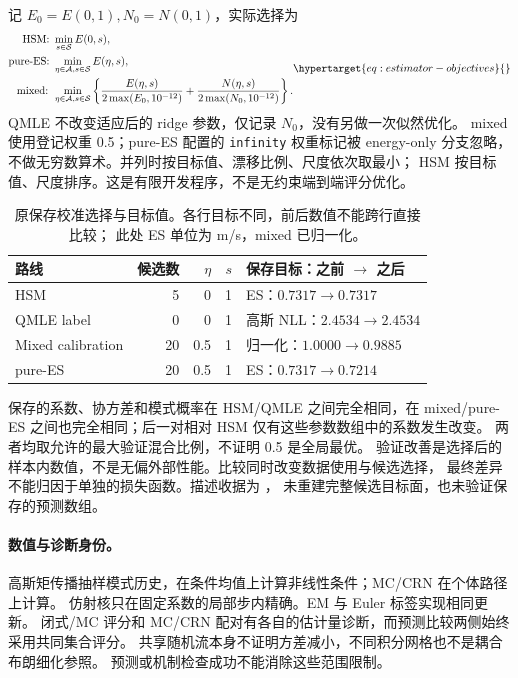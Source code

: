 记 \(E_0=E(0,1),N_0=N(0,1)\)，实际选择为
\begin{equation}
\begin{aligned}
\text{HSM: }&\min_{s\in\mathcal S} E(0,s),\\
\text{pure-ES: }&\min_{\eta\in\mathcal A,s\in\mathcal S}E(\eta,s),\\
\text{mixed: }&\min_{\eta\in\mathcal A,s\in\mathcal S}
 \left\{\frac{E(\eta,s)}{2\max(E_0,10^{-12})}
       +\frac{N(\eta,s)}{2\max(N_0,10^{-12})}\right\}.
\end{aligned}
\label{eq:estimator-objectives}\hypertarget{eq:estimator-objectives}{}
\end{equation}
QMLE 不改变适应后的 ridge 参数，仅记录 \(N_0\)，没有另做一次似然优化。
mixed 使用登记权重 0.5；pure-ES 配置的 \texttt{infinity} 权重标记被 energy-only
分支忽略，不做无穷数算术。并列时按目标值、漂移比例、尺度依次取最小；
HSM 按目标值、尺度排序。这是有限开发程序，不是无约束端到端评分优化。

\begin{table}[htbp]
\centering\small
\caption{原保存校准选择与目标值。各行目标不同，前后数值不能跨行直接比较；
此处 ES 单位为 m/s，mixed 已归一化。}
\label{tab:estimator-calibration}\hypertarget{tab:estimator-calibration}{}
\begin{tabular}{lrrrl}
\toprule
路线 & 候选数 & \(\eta\) & \(s\) & 保存目标：之前 \(\to\) 之后\\
\midrule
HSM & 5 & 0 & 1 & ES：\(0.7317\to0.7317\)\\
QMLE label & 0 & 0 & 1 & 高斯 NLL：\(2.4534\to2.4534\)\\
Mixed calibration & 20 & 0.5 & 1 & 归一化：\(1.0000\to0.9885\)\\
pure-ES & 20 & 0.5 & 1 & ES：\(0.7317\to0.7214\)\\
\bottomrule
\end{tabular}
\end{table}

保存的系数、协方差和模式概率在 HSM/QMLE 之间完全相同，在 mixed/pure-ES
之间也完全相同；后一对相对 HSM 仅有这些参数数组中的系数发生改变。
两者均取允许的最大验证混合比例，不证明 0.5 是全局最优。
验证改善是选择后的样本内数值，不是无偏外部性能。比较同时改变数据使用与候选选择，
最终差异不能归因于单独的损失函数。描述收据为
，
未重建完整候选目标面，也未验证保存的预测数组。

\paragraph{数值与诊断身份。}
高斯矩传播抽样模式历史，在条件均值上计算非线性条件；MC/CRN 在个体路径上计算。
仿射核只在固定系数的局部步内精确。EM 与 Euler 标签实现相同更新。
闭式/MC 评分和 MC/CRN 配对有各自的估计量诊断，而预测比较两侧始终采用共同集合评分。
共享随机流本身不证明方差减小，不同积分网格也不是耦合布朗细化参照。
预测或机制检查成功不能消除这些范围限制。

